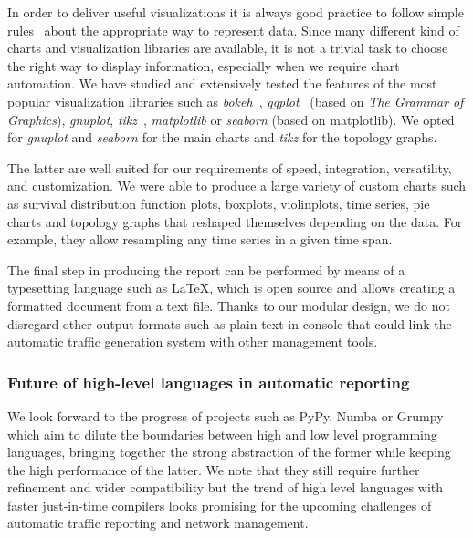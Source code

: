 \documentclass[AMA,STIX1COL]{WileyNJD-v2}
\begin{document}
In order to deliver useful visualizations it is always good practice to follow simple rules~\cite{10RULES} about the appropriate way to represent data. Since many different kind of charts and visualization libraries are available, it is not a trivial task to choose the right way to display information, especially when we require chart automation. We have studied and extensively tested the features of the most popular visualization libraries such as \emph{bokeh}~\cite{bokeh_web}, \emph{ggplot}~\cite{ggplot_web} (based on \textit{The Grammar of Graphics}\cite{ggrammar}), \emph{gnuplot}\cite{gnuplot_web}, \emph{tikz}~\cite{tikz_web}, \emph{matplotlib}\cite{matplotlib_web} or \emph{seaborn}\cite{seaborn_web} (based on matplotlib). We opted for \emph{gnuplot} and \emph{seaborn} for the main charts and \emph{tikz} for the topology graphs. 

The latter are well suited for our requirements of speed, integration, versatility, and customization. We were able to produce a large variety of custom charts such as survival distribution function plots, boxplots, violinplots, time series, pie charts and topology graphs that reshaped themselves depending on the data. For example, they allow resampling any time series in a given time span.

The final step in producing the report can be performed by means of a typesetting language such as \LaTeX, which is open source and allows creating a formatted document from a text file. Thanks to our modular design, we do not disregard other output formats such as plain text in console that could link the automatic traffic generation system with other management tools.

\subsubsection{Future of high-level languages in automatic reporting}

We look forward to the progress of projects such as PyPy\cite{pypy_web}, Numba\cite{numba_web} or Grumpy~\cite{grumpy_web} which aim to dilute the boundaries between high and low level programming languages, bringing together the strong abstraction of the former while keeping the high performance of the latter. We note that they still require further refinement and wider compatibility but the trend of high level languages with faster just-in-time compilers looks promising for the upcoming challenges of automatic traffic reporting and network management.
\end{document}
